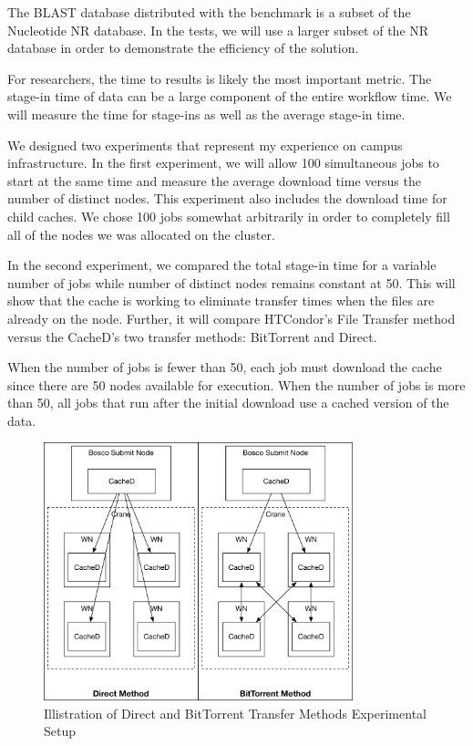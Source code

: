 The BLAST database distributed with the benchmark is a subset of the Nucleotide NR database.  In the tests, we will use a larger subset of the NR database in order to demonstrate the efficiency of the solution.

For researchers, the time to results is likely the most important metric.  The stage-in time of data can be a large component of the entire workflow time.  We will measure the time for stage-ins as well as the average stage-in time.

We designed two experiments that represent my experience on campus infrastructure.  In the first experiment, we will allow 100 simultaneous jobs to start at the same time and measure the average download time versus the number of distinct nodes.  This experiment also includes the download time for child caches.  We chose 100 jobs somewhat arbitrarily in order to completely fill all of the nodes we was allocated on the cluster.  

In the second experiment, we compared the total stage-in time for a variable number of jobs while number of distinct nodes remains constant at 50.  This will show that the cache is working to eliminate transfer times when the files are already on the node.  Further, it will compare HTCondor's File Transfer method versus the CacheD's two transfer methods: BitTorrent and Direct.

When the number of jobs is fewer than 50, each job must download the cache since there are 50 nodes available for execution.  When the number of jobs is more than 50, all jobs that run after the initial download use a cached version of the data.

\begin{figure}[h!t]
	\centering
	\includegraphics[width=0.8\textwidth]{images/CachedTransferMethods.pdf}
	\caption{Illistration of Direct and BitTorrent Transfer Methods Experimental Setup}
	\label{fig:cachedexperimentalsetup}
\end{figure}


